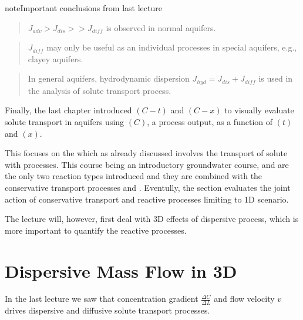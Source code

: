 \documentclass[letterpaper,10pt,english]{jupyterBook}
\begin{document}
\begin{sphinxadmonition}{note}{Important conclusions from last lecture}
\begin{quote}

\sphinxAtStartPar
\(J_{adv}>J_{dis}>>J_{diff}\) is observed in normal aquifers.
\end{quote}
\begin{quote}

\sphinxAtStartPar
\(J_{diff}\) may only be useful as an individual processes in special aquifers, e.g., clayey aquifers.
\end{quote}
\begin{quote}

\sphinxAtStartPar
In general aquifers, hydrodynamic dispersion \(J_{hyd} = J_{dis} + J_{diff}\) is used in the analysis of solute transport process.
\end{quote}
\end{sphinxadmonition}

\sphinxAtStartPar
Finally, the last chapter introduced  \((C-t)\) and  \((C-x)\) to visually evaluate solute transport in aquifers using  \((C)\), a process output, as a function of  \((t)\) and  \((x)\).

\sphinxAtStartPar
This  focuses on the  which as already discussed involves the transport of solute with  processes. This course being an introductory groundwater course,  and  are the only two reaction types introduced and they are combined with the conservative transport processes\sphinxhyphen{}  and . Eventully, the section evaluates the joint action of conservative transport and reactive processes limiting to 1\sphinxhyphen{}D scenario.

\sphinxAtStartPar
The lecture will, however, first deal with 3\sphinxhyphen{}D effects of dispersive process, which is more important to quantify the reactive processes.


\section{Dispersive Mass Flow in 3\sphinxhyphen{}D}
\label{\detokenize{content/transport/L10/22_reactive_transport:dispersive-mass-flow-in-3-d}}
\sphinxAtStartPar
In the last lecture we saw that concentration gradient \(\frac{\Delta C}{\Delta L}\) and flow velocity \(v\) drives dispersive and diffusive solute transport processes.
\end{document}
